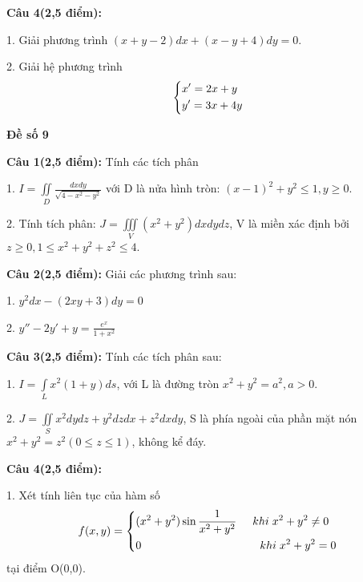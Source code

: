 \documentclass[14pt, a4paper]{article}
\begin{document}
	\vspace{0.5cm}

	\textbf{Câu 4(2,5 điểm):}
	
	1. Giải phương trình $ (x+y-2)dx + (x-y+4)dy=0 $.
	
	2. Giải hệ phương trình \[\left\{ \begin{gathered}
		x' = 2x + y \hfill \\
		y' = 3x + 4y \hfill \\ 
	\end{gathered}  \right.\]

	\pagebreak
	
	\begin{center}
		{\large \textbf{Đề số 9}}
	\end{center}
	
	\textbf{Câu 1(2,5 điểm):} Tính các tích phân
	
	1. $ I = \iint\limits_D {\frac{{dxdy}}{{\sqrt {4 - {x^2} - {y^2}} }}} $ với D là nửa hình tròn: $ {(x - 1)^2} + {y^2} \leqslant 1,y \geqslant 0 $.
	
	2. Tính tích phân: $ J = \iiint\limits_V {({x^2} + {y^2})dxdydz} $, V là miền xác định bởi $ z \geqslant 0,1 \leqslant {x^2} + {y^2} + {z^2} \leqslant 4 $.
	
	\vspace{0.5cm}
	
	\textbf{Câu 2(2,5 điểm):} Giải các phương trình sau:
	
	1. $ {y^2}dx - (2xy + 3)dy = 0 $
	
	2. $ y'' - 2y' + y = \frac{{{e^x}}}{{1 + {x^2}}} $
	
	\vspace{0.5cm}
	
	\textbf{Câu 3(2,5 điểm):} Tính các tích phân sau:
	
	1. 	$ I = \int\limits_L {{x^2}(1 + y)ds}  $, với L là đường tròn $ {x^2} + {y^2} = {a^2}, a > 0 $.
	
	2. $ J = \iint\limits_S {{x^2}dydz + {y^2}dzdx} + {z^2}dxdy $, S là phía ngoài của phần mặt nón $ {x^2} + {y^2} = {z^2}(0 \leqslant z \leqslant 1) $, không kể đáy.
	
	\vspace{0.5cm}
	
	\textbf{Câu 4(2,5 điểm):}
	
	1. Xét tính liên tục của hàm số
	\[f(x,y) = \left\{ \begin{gathered}
		({x^2} + {y^2})\sin \frac{1}{{{x^2} + {y^2}}} \hspace{0.5cm} khi \hspace{0.1cm} {x^2} + {y^2} \ne 0  \hfill \\
		0 \hspace{3.725cm} khi \hspace{0.1cm} {x^2} + {y^2} = 0 \hfill \\ 
	\end{gathered}  \right.\] tại điểm O(0,0).
	
\end{document}
